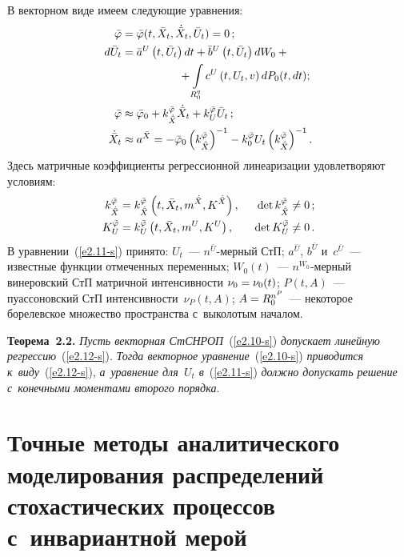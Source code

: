 \begin{multicols}{2}
В векторном виде имеем следующие уравнения:
    \begin{align}
    \bar\varphi &=\bar\varphi (t, \bar X_t,\dot{\bar X}_t,\bar U_t) =0\,;\label{e2.10-s}\\
    d\bar U_t &= \bar a^U \left(t,\bar U_t\right) dt + \bar b^U \left(t, \bar U_t\right) dW_0 +{}\notag\\
    &\hspace*{18mm}{}+ \iii_{R_0^q} c^U \left(t, U_t, v\right) d P_0 (t, dt);\label{e2.11-s}\\
    \bar \varphi &\approx \bar\varphi_0 + k_{\dot{\bar X}}^{\bar\varphi} \dot{\bar X}_t + k_U^{\bar \varphi} \bar U_t\,;\label{e2.12-s}\\
    \dot{\bar X}_t &\approx a^{\bar X} =- \bar\varphi_0 \left(k_{\dot{\bar X}}^{\bar\varphi}\right)^{-1} - 
    k_0^{\bar\varphi} U_t \left(k_{\dot{\bar X}}^{\bar\varphi}\right)^{-1}.\notag %
    \end{align}
Здесь матричные коэффициенты регрессионной линеаризации удовлетворяют условиям:
\begin{alignat*}{2}
k_{\dot{\bar X}}^{\bar\varphi}&= k_{\dot{\bar X}}^{\bar\varphi}\left(t,\bar X_t, m^{\dot{\bar X}}, K^{\dot{\bar X}}\right), & \enskip \det k_{\dot{\bar X}}^{\bar\varphi} 
&\ne 0\,; %
\\
    K_U^{\bar\varphi} &= k_U^{\bar\varphi} \left(t,\bar X_t, m^U, K^U\right), & \enskip \det K_U^{\bar\varphi} &\ne 0\,.%
    \end{alignat*}
В уравнении~(\ref{e2.11-s}) принято: $U_t$~--- $n^{\bar U}$-мер\-ный СтП; $a^{\bar U}$, $b^{\bar U}$ и~$c^{\bar U}$~--- 
известные функции отмеченных переменных; $W_0(t)$~--- $n^{W_0}$-мер\-ный винеровский СтП мат\-рич\-ной ин\-тен\-сив\-ности $\nu_0\hm=\nu_0(t)$; 
$P(t,A)$~--- пуассоновский СтП ин\-тен\-сив\-ности~$\nu_P (t,A)$; $A\hm=R_0^{n^P}$~--- некоторое борелевское множество пространства с~выколотым началом.

\smallskip

\noindent
\textbf{Теорема~2.2.} \textit{Пусть векторная СтСНРОП}~(\ref{e2.10-s}) 
\textit{допускает линейную регрессию}~(\ref{e2.12-s}). \textit{Тогда векторное уравнение}~(\ref{e2.10-s}) 
\textit{приводится к~виду}~(\ref{e2.12-s}), \textit{а~уравнение для~$U_t$ в}~(\ref{e2.11-s}) 
\textit{должно допускать решение с~конечными моментами второго порядка}.


\section{Точные методы аналитического моделирования распределений стохастических процессов с~инвариантной мерой}


\end{multicols}
